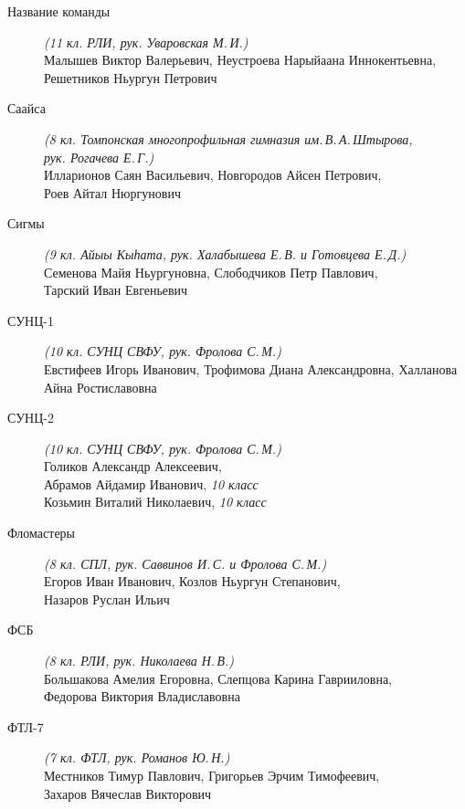 \begin{description}
\item[Название команды] \textit{(11 кл. РЛИ, рук. Уваровская М.\,И.)} \\
Малышев Виктор Валерьевич, Неустроева Нарыйаана Иннокентьевна, \\
Решетников Ньургун Петрович

\item[Саайса] \textit{(8 кл. Томпонская многопрофильная гимназия им.\,В.\,А.\,Штырова, \\
рук. Рогачева Е.\,Г.)} \\
Илларионов Саян Васильевич, Новгородов Айсен Петрович, \\
Роев Айтал Нюргунович

\item[Сигмы] \textit{(9 кл. Айыы Кыһата, рук. Халабышева Е.\,В. и Готовцева Е.\,Д.)} \\
Семенова Майя Ньургуновна, Слободчиков Петр Павлович, \\
Тарский Иван Евгеньевич

\item[СУНЦ-1] \textit{(10 кл. СУНЦ СВФУ, рук. Фролова С.\,М.)} \\
Евстифеев Игорь Иванович, Трофимова Диана Александровна, Халланова Айна Ростиславовна

\item[СУНЦ-2] \textit{(10 кл. СУНЦ СВФУ, рук. Фролова С.\,М.)} \\
Голиков Александр Алексеевич, \\
Абрамов Айдамир Иванович, \textit{10 класс} \\
Козьмин Виталий Николаевич, \textit{10 класс}

\item[Фломастеры] \textit{(8 кл. СПЛ, рук. Саввинов И.\,С. и Фролова С.\,М.)} \\
Егоров Иван Иванович, Козлов Ньургун Степанович, \\
Назаров Руслан Ильич

\item[ФСБ] \textit{(8 кл. РЛИ, рук. Николаева Н.\,В.)} \\
Большакова Амелия Егоровна, Слепцова Карина Гаврииловна, \\
Федорова Виктория Владиславовна

\item[ФТЛ-7] \textit{(7 кл. ФТЛ, рук. Романов Ю.\,Н.)} \\
Местников Тимур Павлович, Григорьев Эрчим Тимофеевич, \\
Захаров Вячеслав Викторович


\end{description}
